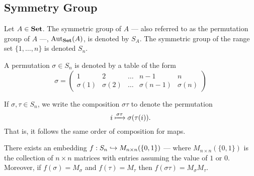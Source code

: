 \subsection{Symmetry Group}

\begin{definition}\label{def: sym-group}
Let \(A \in {\textbf{Set}}\). The symmetric group of \(A\) --- also referred to as the
permutation group of \(A\) ---, \(\operatorname{Aut}_{\textbf{Set}}(A)\), is denoted by \(S_A\). The
symmetric group of the range set \(\{1, \dots, n\}\) is denoted \(S_n\).
\end{definition}

\begin{notation}[Permutations]
A permutation \(\sigma \in S_n\) is denoted by a table of the form
\[
  \sigma =
  \begin{pmatrix}
    1 &2 &\dots &n-1 &n \\
    \sigma(1) &\sigma(2) &\dots &\sigma(n-1) &\sigma(n)
  \end{pmatrix}
\]
\end{notation}

\begin{remark}[Convention]\label{rem: convention-perm}
If \(\sigma, \tau \in S_n\), we write the composition \(\sigma \tau\)
to denote the permutation
\[
  i \xmapsto{\sigma\tau} \sigma(\tau(i)).
\]
That is, it follows the same order of composition for maps.
\end{remark}

\begin{proposition}
There exists an embedding \(f: S_n \hookrightarrow M_{n \times n}(\{0, 1\})\)
--- where \(M_{n \times n}(\{0, 1\})\) is the collection of \(n \times n\)
matrices with entries assuming the value of \(1\) or \(0\). Moreover, if
\(f(\sigma) = M_\sigma\) and \(f(\tau) = M_\tau\) then \(f(\sigma \tau) =
M_\sigma M_\tau\).
\end{proposition}

